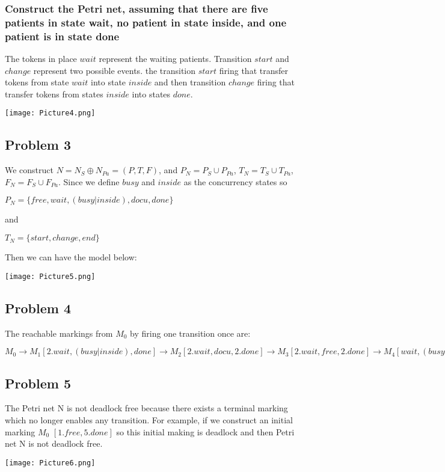 \documentclass[a4paper]{article}
\begin{document}
\subsubsection{Construct the Petri net, assuming that there are five patients in state wait, no patient in state inside, and one patient is in state done}
The tokens in place $wait$ represent the waiting patients. Transition $start$ and $change$ represent two possible events. the transition $start$ firing that transfer tokens from state $wait$ into state $inside$ and then transition $change$ firing that transfer tokens from states $inside$ into states $done$. 
\begin{center}
    \texttt{[image: Picture4.png]}
\end{center}

\subsection{Problem 3}
We construct $N = N_{S} \oplus N_{Pa} = (P, T, F)$, and $P_{N} = P_{S} \cup P_{Pa}$, $T_{N} = T_{S} \cup T_{Pa}$, $F_{N} = F_{S} \cup F_{Pa}$.\newline
Since we define $busy$ and $inside$ as the concurrency states so
\begin{center}
    $P_{N} = \{free, wait, (busy|inside), docu, done\}$
\end{center}
and
\begin{center}
    $T_{N} = \{start, change, end\}$
\end{center}
Then we can have the model below:
\begin{center}
    \texttt{[image: Picture5.png]}
\end{center}

\subsection{Problem 4}
The reachable markings from $M_0$ by firing one transition once are:
\begin{center}
    $M_{0} \rightarrow M_{1}[2.wait, (busy|inside), done] \rightarrow M_{2}[2.wait, docu, 2.done] \rightarrow M_{3}[2.wait, free, 2.done] \rightarrow M_{4}[wait, (busy|inside), 2.done] \rightarrow M_{5}[wait, docu, 3.done] \rightarrow M_{6}[wait, free, 3.done] \rightarrow M_{7}[(busy|inside), 3.done] \rightarrow M_{8}[docu, 4.done] \rightarrow M_{9}[free, 4.done]$
\end{center}

\subsection{Problem 5}
The Petri net N is not deadlock free because there exists a terminal marking which no longer enables any transition. For example, if we construct an initial marking $M_0$ $[1.free,5.done]$ so this initial making is deadlock and then Petri net N is not deadlock free.
\begin{center}
    \texttt{[image: Picture6.png]}
\end{center}
\end{document}

